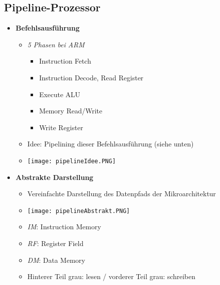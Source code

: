 \subsection{Pipeline-Prozessor}
    \begin{itemize}
        \item \textbf{Befehlsausführung}
            \begin{itemize}
                \item \textit{5 Phasen bei ARM}
                    \begin{itemize}
                        \item Instruction Fetch
                        \item Instruction Decode, Read Register
                        \item Execute ALU
                        \item Memory Read/Write
                        \item Write Register
                    \end{itemize}
                \item Idee: Pipelining dieser Befehlsausführung (siehe unten)
                \item[] \texttt{[image: pipelineIdee.PNG]}
            \end{itemize}

        \item \textbf{Abstrakte Darstellung}
            \begin{itemize}
                \item Vereinfachte Darstellung des Datenpfads der Mikroarchitektur
                \item[] \texttt{[image: pipelineAbstrakt.PNG]}
                \item \textit{IM}: Instruction Memory
                \item \textit{RF}: Register Field
                \item \textit{DM}: Data Memory
                \item Hinterer Teil grau: lesen / vorderer Teil grau: schreiben 
            \end{itemize}


\end{itemize}
